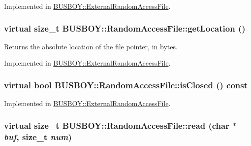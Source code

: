 Implemented in \hyperlink{classBUSBOY_1_1ExternalRandomAccessFile_ac989792676e37f9d363804162e21aef9}{BUSBOY::ExternalRandomAccessFile}.\hypertarget{classBUSBOY_1_1RandomAccessFile_a51f73555d719157ab2bb6df166dd0074}{
\subsubsection[{getLocation}]{\setlength{\rightskip}{0pt plus 5cm}virtual size\_\-t BUSBOY::RandomAccessFile::getLocation ()}}
\label{classBUSBOY_1_1RandomAccessFile_a51f73555d719157ab2bb6df166dd0074}


Returns the absolute location of the file pointer, in bytes. 

Implemented in \hyperlink{classBUSBOY_1_1ExternalRandomAccessFile_a513ff2125eb4dfb6ebb8456cbb74a386}{BUSBOY::ExternalRandomAccessFile}.\hypertarget{classBUSBOY_1_1RandomAccessFile_ab31acc588485ee4832e96c907fe998fd}{
\subsubsection[{isClosed}]{\setlength{\rightskip}{0pt plus 5cm}virtual bool BUSBOY::RandomAccessFile::isClosed () const}}
\label{classBUSBOY_1_1RandomAccessFile_ab31acc588485ee4832e96c907fe998fd}


Implemented in \hyperlink{classBUSBOY_1_1ExternalRandomAccessFile_aabfe65bbe76080f7e551ca2c8ea4123d}{BUSBOY::ExternalRandomAccessFile}.\hypertarget{classBUSBOY_1_1RandomAccessFile_ac8fa9aa05b321b980757a6d80f4eefae}{
\subsubsection[{read}]{\setlength{\rightskip}{0pt plus 5cm}virtual size\_\-t BUSBOY::RandomAccessFile::read (char $\ast$ {\em buf}, \/  size\_\-t {\em num})}}
\label{classBUSBOY_1_1RandomAccessFile_ac8fa9aa05b321b980757a6d80f4eefae}


